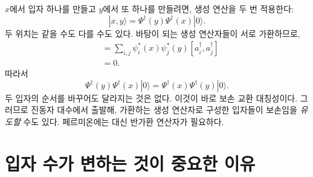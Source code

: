 \(x\)에서 입자 하나를 만들고 \(y\)에서 또 하나를 만들려면, 생성 연산을 두 번 적용한다:
\begin{equation}
|x,y\rangle
=\Psi^\dagger(y)\Psi^\dagger(x)|0\rangle.
\label{eq:l06-two-particle-state}
\end{equation}
두 위치는 같을 수도 다를 수도 있다. 바탕이 되는 생성 연산자들이 서로 가환하므로,
\begin{align}
[\Psi^\dagger(x),\Psi^\dagger(y)]
&=\sum_{i,j}\psi_i^*(x)\psi_j^*(y)
[a_i^\dagger,a_j^\dagger] \\
&=0.
\end{align}
따라서
\begin{equation}
\Psi^\dagger(y)\Psi^\dagger(x)|0\rangle
=\Psi^\dagger(x)\Psi^\dagger(y)|0\rangle.
\label{eq:l06-boson-exchange}
\end{equation}
두 입자의 순서를 바꾸어도 달라지는 것은 없다. 이것이 바로 보손 교환 대칭성이다. 그러므로 진동자 대수에서 출발해, 가환하는 생성 연산자로 구성한 입자들이 보손임을 \emph{유도할} 수도 있다. 페르미온에는 대신 반가환 연산자가 필요하다.

\begin{classroomqa}
\end{classroomqa}

\begin{classroomqa}
\end{classroomqa}

\begin{classroomqa}
\end{classroomqa}

\section{입자 수가 변하는 것이 중요한 이유}

